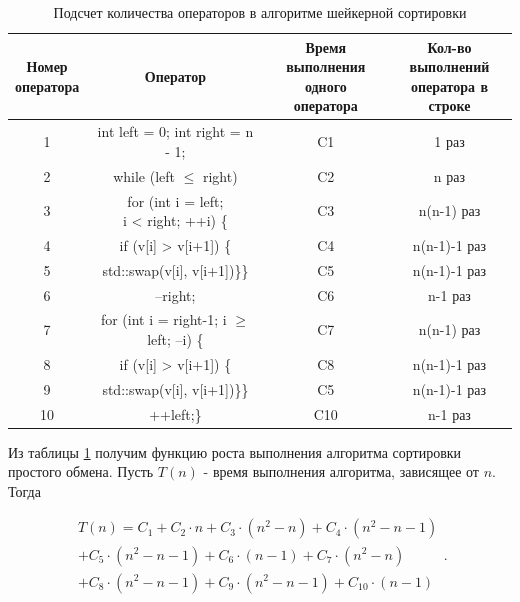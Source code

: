 \documentclass[a4paper, 14pt]{extarticle}
\begin{document}
\begin{table}[htpb]
  \centering
  \caption{Подсчет количества операторов в алгоритме шейкерной сортировки}
  \label{tab:second_sort_speed}
  \begin{tabular}{|c|c|c|c|}
    \hline
    \parbox[m]{2cm}{\centering Номер \\ оператора}
    & Оператор
    & \parbox[m]{2cm}{\centering Время выполнения \\ одного оператора}
    & \parbox[m]{2cm}{\centering Кол-во выполнений \\ оператора в строке}
    \\  & \parbox[m]{4cm}{\centering int left = 0; int right = n - 1;}
 & C1 & 1 раз
    \\  & while (left $\leq$  right)
      & C2 & n раз
    \\  & \parbox[m]{4cm}{\centering for (int i = left;\\ i < right; ++i) \{ }
      & C3 & n(n-1) раз
      \\  & if (v[i] > v[i+1]) \{ & C4 & n(n-1)-1 раз
    \\  & std::swap(v[i], v[i+1])\}\} & C5 & n(n-1)-1 раз
    \\  & --right; & C6 & n-1 раз
    \\  & \parbox[m]{4cm}{\centering for (int i = right-1;\\ i $\geq$ left; --i) \{ }
      & C7 & n(n-1) раз
      \\  & if (v[i] > v[i+1]) \{ & C8 & n(n-1)-1 раз
    \\  & std::swap(v[i], v[i+1])\}\} & C5 & n(n-1)-1 раз
    \\  & ++left;\} & C10  &  n-1 раз
    \\ \hline
  \end{tabular}
\end{table}

\newpage
Из таблицы \ref{tab:second_sort_speed} получим функцию роста выполнения алгоритма
сортировки простого обмена. Пусть $T(n)$ - время выполнения алгоритма, зависящее
от  $n$. Тогда

\[
  \begin{split}
  T(n) = C_1 + C_2\cdot n + C_3\cdot (n^2-n) + C_4\cdot (n^2-n-1)
  \\ + C_5\cdot (n^2-n-1) + C_6\cdot (n-1) + C_7\cdot (n^2-n)
  \\ + C_8\cdot (n^2-n-1) + C_9\cdot (n^2-n-1) + C_{10}\cdot (n-1) 
  \end{split}
.\]
\end{document}
